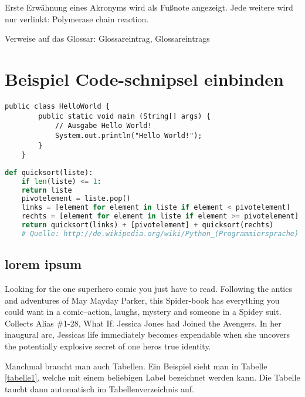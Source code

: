Erste Erwähnung eines Akronyms wird als Fußnote angezeigt. Jede weitere wird
nur verlinkt: \acf{Polymerase chain reaction}. \cite{fsf:2007}

Verweise auf das Glossar: \gls{Glossareintrag}, \glspl{Glossareintrag}


\chapter{Beispiel Code-schnipsel einbinden}


\begin{lstlisting}[caption=Code-Beispiel, label=Bsp.1]
	public class HelloWorld {
		public static void main (String[] args) {
			// Ausgabe Hello World!
			System.out.println("Hello World!");
		}
	}
\end{lstlisting}

\begin{lstlisting}[caption=Python-Code, label=Python-Code, title=Titel des Python-Codes,language=Python]
	def quicksort(liste):
	if len(liste) <= 1:
	return liste
	pivotelement = liste.pop()
	links = [element for element in liste if element < pivotelement]
	rechts = [element for element in liste if element >= pivotelement]
	return quicksort(links) + [pivotelement] + quicksort(rechts)
	# Quelle: http://de.wikipedia.org/wiki/Python_(Programmiersprache)
\end{lstlisting}

\section{lorem ipsum}
Looking for the one superhero comic you just have to read. Following the antics and adventures of May Mayday Parker, this Spider-book has everything you could want in a comic--action, laughs, mystery and someone in a Spidey suit. Collects Alias \#1-28, What If. Jessica Jones had Joined the Avengers. In her inaugural arc, Jessicas life immediately becomes expendable when she uncovers the potentially explosive secret of one heros true identity. 

Manchmal braucht man auch Tabellen. Ein Beispiel sieht man in Tabelle \ref{tabelle1}, welche mit einem beliebigen Label bezeichnet werden kann. Die Tabelle taucht dann automatisch im Tabellenverzeichnis auf.

